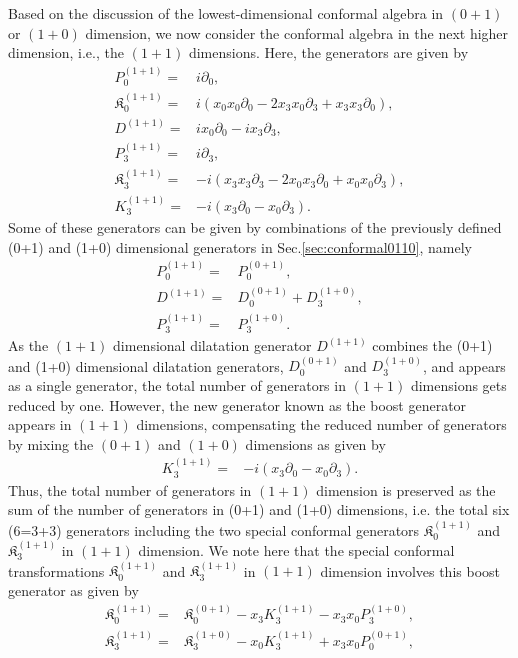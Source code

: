 \documentclass[%
 reprint,
superscriptaddress,
 amsmath,amssymb,
 aps,
]{revtex4-2}
\begin{document}
Based on the discussion of the lowest-dimensional conformal algebra in $(0+1)$ or $(1+0)$ dimension, we now consider the conformal algebra in the next higher dimension, i.e., the $(1+1)$ dimensions. Here, the generators are given by
\begin{align}
    P^{(1+1)}_{0}=&i\partial_{0},\\
    \mathfrak{K}^{(1+1)}_{{0}}=&i(x_{0}x_{0}\partial_{{0}}-2x_{3}x_{0}\partial_{3}+x_{3}x_{3}\partial_{0}),\\
    D^{(1+1)}=&ix_{0}\partial_{0}-ix_{3}\partial_{3},\\
    P^{(1+1)}_{3}=&i\partial_{3},\\
    \mathfrak{K}^{(1+1)}_{{3}}=&-i(x_{3}x_{3}\partial_{{3}}-2x_{0}x_{3}\partial_{0}+x_{0}x_{0}\partial_{3}),\\
    K_{3}^{(1+1)}=&-i(x_{3}\partial_{0}-x_{0}\partial_{3}).
\end{align}
Some of these generators can be given by 
combinations of the previously defined (0+1) and (1+0) dimensional generators in Sec.\ref{sec:conformal0110}, namely
\begin{align}
    P^{(1+1)}_{0}=&P^{(0+1)}_{0},\\
    D^{(1+1)}=&D^{(0+1)}_{0}+D^{(1+0)}_{3},\\
    P^{(1+1)}_{3}=&P^{(1+0)}_{3}.
\end{align}
As the $(1+1)$ dimensional dilatation generator $D^{(1+1)}$ combines the (0+1) and (1+0) dimensional dilatation generators, $D^{(0+1)}_{0}$ and $D^{(1+0)}_{3}$, and appears as a single generator, the total number of generators in $(1+1)$ dimensions gets reduced by one. 
However, the new generator known as the boost generator appears in $(1+1)$ dimensions, compensating the reduced number of generators by mixing the $(0+1)$ and $(1+0)$ dimensions as given by
\begin{align}
K_{3}^{(1+1)}=&-i(x_{3}\partial_{0}-x_{0}\partial_{3}).
\end{align}
Thus, the total number of generators in $(1+1)$ dimension is preserved as the sum of the number of generators in (0+1) and (1+0) dimensions, i.e. the total six (6=3+3) generators including the two special conformal generators $\mathfrak{K}^{(1+1)}_{{0}}$ and $\mathfrak{K}^{(1+1)}_{{3}}$ in $(1+1)$ dimension. We note here that 
the special conformal transformations $\mathfrak{K}^{(1+1)}_{{0}}$
and $\mathfrak{K}^{(1+1)}_{{3}}$ in $(1+1)$ dimension involves this boost generator as given by
\begin{align}
\mathfrak{K}^{(1+1)}_{{0}}=&\mathfrak{K}^{(0+1)}_{{0}}-x_{3}K_{3}^{(1+1)}-x_{3}x_{0}P^{(1+0)}_{3},\\
\mathfrak{K}^{(1+1)}_{{3}}=&\mathfrak{K}^{(1+0)}_{{3}}-x_{0}K_{3}^{(1+1)}+x_{3}x_{0}P^{(0+1)}_{0},
\end{align}
\end{document}
